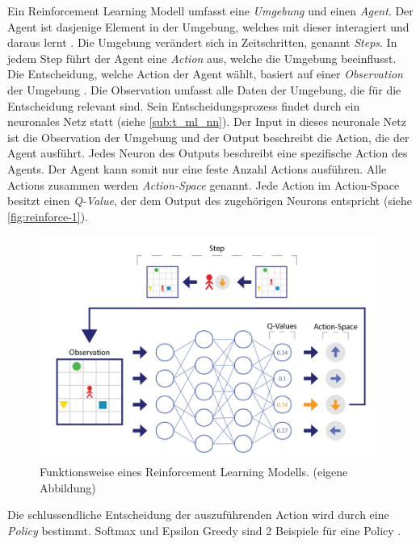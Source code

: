 Ein Reinforcement Learning Modell umfasst eine \emph{Umgebung} und einen
\emph{Agent}. Der Agent ist dasjenige Element in der Umgebung, welches mit
dieser interagiert und daraus lernt \cite[S. 53]{sutton_reinforcement_2014}. Die
Umgebung verändert sich in Zeitschritten, genannt \emph{Steps}. In jedem Step
führt der Agent eine \emph{Action} aus, welche die Umgebung beeinflusst. Die
Entscheidung, welche Action der Agent wählt, basiert auf einer
\emph{Observation} der Umgebung \cite[S. 2]{mnih_playing_2013}. Die Observation
umfasst alle Daten der Umgebung, die für die Entscheidung relevant sind. Sein
Entscheidungsprozess findet durch ein neuronales Netz statt (siehe
\ref{sub:t_ml_nn}). Der Input in dieses neuronale Netz ist die Observation
der Umgebung und der Output beschreibt die Action, die der Agent ausführt. Jedes
Neuron des Outputs beschreibt eine spezifische Action des Agents. Der Agent kann
somit nur eine feste Anzahl Actions ausführen. Alle Actions zusammen werden
\emph{Action-Space} \cite[S. 67]{sutton_reinforcement_2014} genannt. Jede Action
im Action-Space besitzt einen \emph{Q-Value}, der dem Output des zugehörigen
Neurons entspricht (siehe \autoref{fig:reinforce-1}). 


\begin{figure}[!ht]
    \centering
    \includegraphics[width=\textwidth-1cm]{images/theorie/reinforce-1.png}
    \caption{Funktionsweise eines Reinforcement Learning Modells. (eigene Abbildung)}\label{fig:reinforce-1}
 \end{figure}

Die schlussendliche Entscheidung der auszuführenden Action wird durch eine
\emph{Policy} bestimmt. Softmax und Epsilon Greedy sind 2 Beispiele für eine
Policy \cite[S. 34]{sutton_reinforcement_2014}. 

